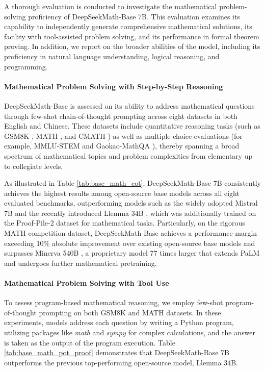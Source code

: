 A thorough evaluation is conducted to investigate the mathematical problem-solving proficiency of DeepSeekMath-Base 7B. This evaluation examines its capability to independently generate comprehensive mathematical solutions, its facility with tool-assisted problem solving, and its performance in formal theorem proving. In addition, we report on the broader abilities of the model, including its proficiency in natural language understanding, logical reasoning, and programming.

\paragraph{Mathematical Problem Solving with Step-by-Step Reasoning}

DeepSeekMath-Base is assessed on its ability to address mathematical questions through few-shot chain-of-thought prompting \citep{cot} across eight datasets in both English and Chinese. These datasets include quantitative reasoning tasks (such as GSM8K \citep{gsm8k}, MATH \citep{MATH}, and CMATH \citep{wei2023cmath}) as well as multiple-choice evaluations (for example, MMLU-STEM \citep{mmlu} and Gaokao-MathQA \citep{agieval}), thereby spanning a broad spectrum of mathematical topics and problem complexities from elementary up to collegiate levels.

As illustrated in Table \ref{tab:base_math_cot}, DeepSeekMath-Base 7B consistently achieves the highest results among open-source base models across all eight evaluated benchmarks, outperforming models such as the widely adopted Mistral 7B \citep{mistral} and the recently introduced Llemma 34B \citep{llemma}, which was additionally trained on the Proof-Pile-2 dataset \citep{llemma} for mathematical tasks. Particularly, on the rigorous MATH competition dataset, DeepSeekMath-Base achieves a performance margin exceeding 10\% absolute improvement over existing open-source base models and surpasses Minerva 540B \citep{minerva}, a proprietary model 77 times larger that extends PaLM \citep{palm} and undergoes further mathematical pretraining.

\paragraph{Mathematical Problem Solving with Tool Use} To assess program-based mathematical reasoning, we employ few-shot program-of-thought prompting \citep{pot,pal} on both GSM8K and MATH datasets. In these experiments, models address each question by writing a Python program, utilizing packages like \textit{math} and \textit{sympy} for complex calculations, and the answer is taken as the output of the program execution. Table \ref{tab:base_math_pot_proof} demonstrates that DeepSeekMath-Base 7B outperforms the previous top-performing open-source model, Llemma 34B.

